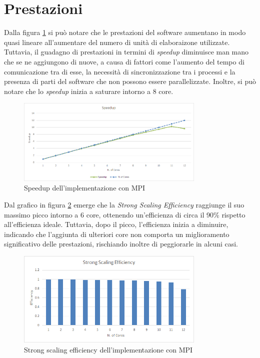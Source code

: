 \documentclass[a4paper, 12pt]{report}
\begin{document}
\section*{Prestazioni}
\begin{sloppypar}
  \noindent
  Dalla figura \ref{fig:mpi_speedup} si può notare che le prestazioni del software aumentano in modo 
  quasi lineare all'aumentare del numero di unità di elaboraizone utilizzate. Tuttavia, il guadagno di prestazioni in 
  termini di \textit{speedup} diminuisce man mano che se ne aggiungono di nuove, a causa di fattori come l'aumento 
  del tempo di comunicazione tra di esse, la necessità di sincronizzazione tra i processi e la presenza di 
  parti del software che non possono essere parallelizzate. Inoltre, si può notare che lo \textit{speedup} 
  inizia a saturare intorno a 8 core.

  \begin{figure}[ht]
    \centering
    \includegraphics[width=9cm]{img/mpi-speedup.png}
    \caption{Speedup dell'implementazione con MPI}
    \label{fig:mpi_speedup}
  \end{figure}

  \noindent
  Dal grafico in figura \ref{fig:mpi_sse} emerge che la \textit{Strong Scaling Efficiency} raggiunge il suo 
  massimo picco intorno a 6 core, ottenendo un'efficienza di circa il 90\% rispetto all'efficienza ideale. 
  Tuttavia, dopo il picco, l'efficienza inizia a diminuire, indicando che l'aggiunta di ulteriori core non 
  comporta un miglioramento significativo delle prestazioni, rischiando inoltre di peggiorarle in alcuni casi.

  \begin{figure}[ht]
    \centering
    \includegraphics[width=9cm]{img/mpi-sse.png}
    \caption{Strong scaling efficiency dell'implementazione con MPI}
    \label{fig:mpi_sse}
  \end{figure}


\end{sloppypar}
\end{document}
